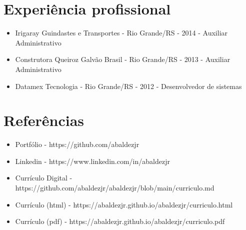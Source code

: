 \documentclass[11pt,oneside,a4paper]{article}
\begin{document}
    \section*{Experiência profissional}
    \begin{itemize}
        \item Irigaray Guindastes e Transportes - Rio Grande/RS - 2014 - Auxiliar Administrativo
        \item Construtora Queiroz Galvão Brasil - Rio Grande/RS - 2013 - Auxiliar Administrativo
        \item Datamex Tecnologia - Rio Grande/RS - 2012 - Desenvolvedor de sistemas
    \end{itemize}
    \section*{Referências}
    \begin{itemize}
        \item Portfólio - https://github.com/abaldezjr
        \item Linkedin - https://www.linkedin.com/in/abaldezjr
        \item Currículo Digital - https://github.com/abaldezjr/abaldezjr/blob/main/curriculo.md
        \item Currículo (html) - https://abaldezjr.github.io/abaldezjr/curriculo.html
        \item Currículo (pdf) - https://abaldezjr.github.io/abaldezjr/curriculo.pdf
    \end{itemize}
\end{document}
